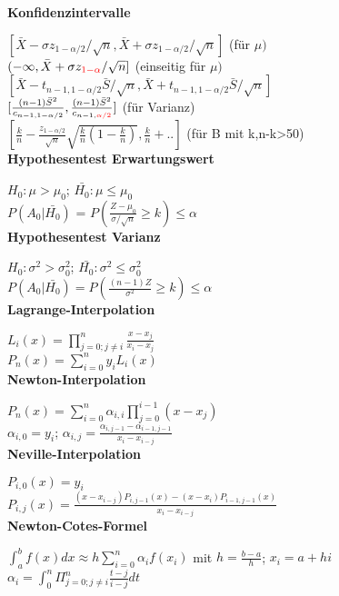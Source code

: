 \documentclass[10pt,twocolumn,a4paper]{article}
\begin{document}
\begin{flushleft}
\textbf{Konfidenzintervalle}

$[\bar{X}-\sigma z_{1-\alpha/2}/\sqrt{n}, \bar{X}+\sigma z_{1-\alpha/2}/\sqrt{n}]$ (für $\mu)$\\
$(-\infty, \bar{X}+\sigma z_{\textcolor{red}{1-\alpha}}/\sqrt{n}]$ (einseitig für $\mu)$\\
$[\bar{X} - t_{n-1,1-\alpha/2}\bar{S}/\sqrt{n}, \bar{X} + t_{n-1,1-\alpha/2}\bar{S}/\sqrt{n}]$\\
$[\frac{(n-1)\bar{S}^2}{c_{n-1,1-\alpha/2}},\frac{(n-1)\bar{S}^2}{c_{n-1,\textcolor{red}{\alpha/2}}}]$ (für Varianz)\\
$[\frac{k}{n}-\frac{z_{1-\alpha/2}}{\sqrt{n}}\sqrt{\frac{k}{n}(1-\frac{k}{n})}, \frac{k}{n}+..]$ (für B mit k,n-k>50)\\

\textbf{Hypothesentest Erwartungswert}

$H_0: \mu > \mu_0$; $\bar{H_0}: \mu \leq \mu_0$\\
$P(A_0|\bar{H_0})$ = $P(\frac{Z-\mu_0}{\sigma/\sqrt{n}} \geq k) \leq \alpha$\\

\textbf{Hypothesentest Varianz}

$H_0: \sigma^2 > \sigma_0^2$; $\bar{H_0}: \sigma^2 \leq \sigma_0^2$\\
$P(A_0|\bar{H_0}) = P(\frac{(n-1)Z}{\sigma^2} \geq k) \leq \alpha$\\

\textbf{Lagrange-Interpolation}

$L_i(x) = \prod_{j=0;j \ne i}^n \frac{x-x_j}{x_i-x_j}$\\
$P_n(x) = \sum_{i=0}^n y_i L_i(x)$\\

\textbf{Newton-Interpolation}

$P_n(x) = \sum_{i=0}^n \alpha_{i,i} \prod_{j=0}^{i-1}(x-x_j)$\\
$\alpha_{i,0} = y_i$; $\alpha_{i,j} = \frac{\alpha_{i,j-1} - \alpha_{i-1,j-1}}{x_i - x_{i-j}}$\\

\textbf{Neville-Interpolation}

$P_{i,0}(x) = y_i$\\
$P_{i,j}(x) = \frac{(x-x_{i-j})P_{i,j-1}(x) - (x-x_i)P_{i-1,j-1}(x)}{x_i - x_{i-j}}$\\

\textbf{Newton-Cotes-Formel}

$\int_a^b f(x) dx \approx h \sum_{i=0}^n \alpha_i f(x_i)$ mit $h=\frac{b-a}{h}$; $x_i = a + hi$\\
$\alpha_i = \int_0^n \Pi_{j=0;j\neq i}^n \frac{t-j}{i-j} dt$\\


\end{flushleft}
\end{document}
